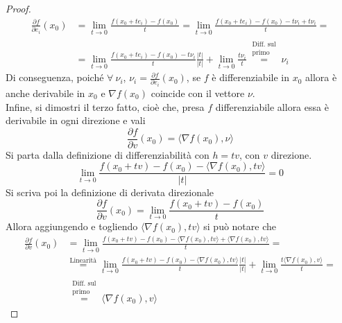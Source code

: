 \begin{proposition}
\begin{proof}
\begin{equation}
\begin{aligned}
               \frac{\partial{f}}{\partial{e_i}}(x_0)&=\lim_{t \to 0}{\frac{f(x_0+te_i)-f(x_0)}{t}}=\lim_{t \to 0}{\frac{f(x_0+te_i)-f(x_0)-t\nu_i+t\nu_i}{t}}=\\
               &=\lim_{t \to 0}{\frac{f(x_0+te_i)-f(x_0)-t\nu_i}{t} \frac{|t|}{|t|}}+\lim_{t \to 0}{\frac{t\nu_i}{t}}\overset{\substack{\text{Diff. sul}\\\text{primo}}}{=} \nu_i
            \end{aligned}
        \end{equation}
        Di conseguenza, poiché $\forall\ \nu_i$, $\nu_i=\frac{\partial{f}}{\partial{e_i}}(x_0)$, se $f$ è differenziabile in $x_0$ allora è anche derivabile in $x_0$ e $\nabla f(x_0)$ coincide con il vettore $\nu$.\\
        Infine, si dimostri il terzo fatto, cioè che, presa $f$ differenziabile allora essa è derivabile in ogni direzione e vali
        \begin{equation}
            \frac{\partial{f}}{\partial{v}}(x_0)=\langle \nabla f(x_0), \nu\rangle
        \end{equation}
        Si parta dalla definizione di differenziabilità con $h=tv$, con $v$ direzione.
        \begin{equation}
            \lim_{t \to 0} {\frac{f(x_0+tv)-f(x_0)-\langle \nabla f (x_0), tv \rangle}{|t|}}=0
        \end{equation}
        Si scriva poi la definizione di derivata direzionale
        \begin{equation}
            \frac{\partial f}{\partial v}(x_0)= \lim_{t \to 0}{\frac{f(x_0+tv)- f(x_0)}{t}}
        \end{equation}
        Allora aggiungendo e togliendo $\langle \nabla f (x_0), tv \rangle$ si può notare che
        \begin{equation}
            \begin{aligned}
                \frac{\partial f}{\partial v}(x_0)&= \lim_{t \to 0}{\frac{f(x_0+tv)- f(x_0) -\langle \nabla f (x_0), tv \rangle+ \langle \nabla f (x_0), tv \rangle}{t}}=\\
                &\overset{\text{Linearità}}{=} \lim_{t \to 0}{\frac{f(x_0+tv)- f(x_0) -\langle \nabla f (x_0), tv \rangle}{t} \frac{|t|}{|t|}} + \lim_{t \to 0}{\frac{t \langle \nabla f (x_0), v \rangle}{t}}=\\
                &\overset{\substack{\text{Diff. sul}\\\text{primo}}}{=} \langle \nabla f (x_0), v \rangle
            \end{aligned}
        \end{equation}
    \end{proof}
\end{proposition}
